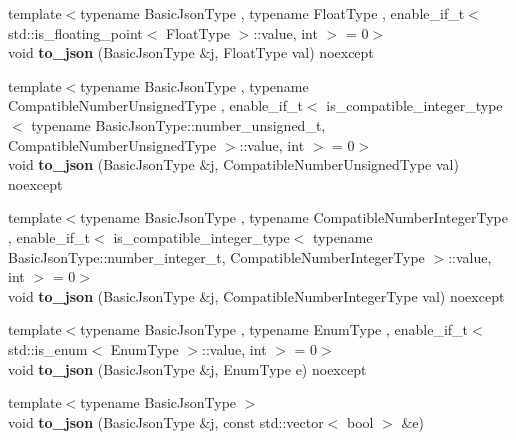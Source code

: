 \begin{DoxyCompactItemize}
\item 
\mbox{\label{namespacenlohmann_1_1detail_a22bffdc8bc7e43af380ba2050696b230}} 
{\footnotesize template$<$typename Basic\+Json\+Type , typename Float\+Type , enable\+\_\+if\+\_\+t$<$ std\+::is\+\_\+floating\+\_\+point$<$ Float\+Type $>$\+::value, int $>$  = 0$>$ }\\void {\bfseries to\+\_\+json} (Basic\+Json\+Type \&j, Float\+Type val) noexcept
\item 
\mbox{\label{namespacenlohmann_1_1detail_ae5fd66b5517b3b5a6c6b9fd9f29ba8dc}} 
{\footnotesize template$<$typename Basic\+Json\+Type , typename Compatible\+Number\+Unsigned\+Type , enable\+\_\+if\+\_\+t$<$ is\+\_\+compatible\+\_\+integer\+\_\+type$<$ typename Basic\+Json\+Type\+::number\+\_\+unsigned\+\_\+t, Compatible\+Number\+Unsigned\+Type $>$\+::value, int $>$  = 0$>$ }\\void {\bfseries to\+\_\+json} (Basic\+Json\+Type \&j, Compatible\+Number\+Unsigned\+Type val) noexcept
\item 
\mbox{\label{namespacenlohmann_1_1detail_a91fe576be579c8c2fdd14610605c6dd2}} 
{\footnotesize template$<$typename Basic\+Json\+Type , typename Compatible\+Number\+Integer\+Type , enable\+\_\+if\+\_\+t$<$ is\+\_\+compatible\+\_\+integer\+\_\+type$<$ typename Basic\+Json\+Type\+::number\+\_\+integer\+\_\+t, Compatible\+Number\+Integer\+Type $>$\+::value, int $>$  = 0$>$ }\\void {\bfseries to\+\_\+json} (Basic\+Json\+Type \&j, Compatible\+Number\+Integer\+Type val) noexcept
\item 
\mbox{\label{namespacenlohmann_1_1detail_a0c8b159dba71981d6c555d284cf6e2bf}} 
{\footnotesize template$<$typename Basic\+Json\+Type , typename Enum\+Type , enable\+\_\+if\+\_\+t$<$ std\+::is\+\_\+enum$<$ Enum\+Type $>$\+::value, int $>$  = 0$>$ }\\void {\bfseries to\+\_\+json} (Basic\+Json\+Type \&j, Enum\+Type e) noexcept
\item 
\mbox{\label{namespacenlohmann_1_1detail_aeca6fb5fede5ed1e12a4420d98a5692b}} 
{\footnotesize template$<$typename Basic\+Json\+Type $>$ }\\void {\bfseries to\+\_\+json} (Basic\+Json\+Type \&j, const std\+::vector$<$ bool $>$ \&e)

\end{DoxyCompactItemize}
